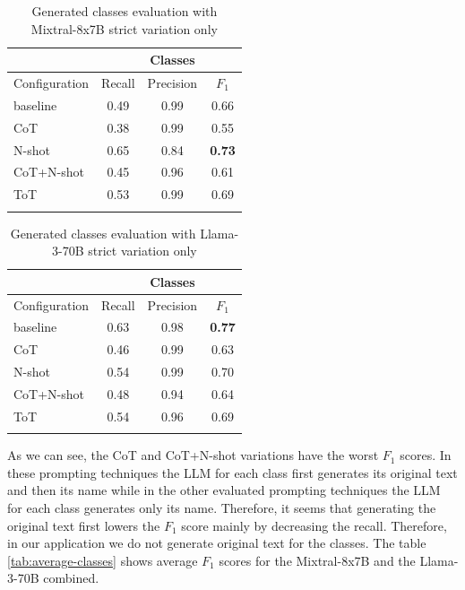 \begin{table}[!h]
    \scriptsize
    \centering
    \setlength{\tabcolsep}{0.5em}
    \begin{tabular}{lccc}
    \toprule
         & & Classes & \\
     \toprule
        Configuration & Recall & Precision & $F_1$ \\
    \toprule
    
    \addlinespace
         baseline    & 0.49 & 0.99 & 0.66 \\
    	 CoT         & 0.38 & 0.99 & 0.55 \\
         N-shot      & 0.65 & 0.84 & \textbf{0.73} \\
         CoT+N-shot  & 0.45 & 0.96 & 0.61 \\
         ToT         & 0.53 & 0.99 & 0.69 \\
    \addlinespace
    \bottomrule
    \addlinespace
    \end{tabular}
    \caption{Generated classes evaluation with Mixtral-8x7B strict variation only}
    \label{tab:mixtral-classes}
\end{table}


\begin{table}[!h]
    \scriptsize
    \centering
    \setlength{\tabcolsep}{0.5em}
    \begin{tabular}{lccc}
    \toprule
    & & Classes & \\
    \toprule
        Configuration & Recall & Precision & $F_1$ \\
    \toprule
    
    \addlinespace
         baseline    & 0.63 & 0.98 & \textbf{0.77} \\
    	 CoT         & 0.46 & 0.99 & 0.63 \\
         N-shot      & 0.54 & 0.99 & 0.70 \\
         CoT+N-shot  & 0.48 & 0.94 & 0.64 \\
         ToT         & 0.54 & 0.96 & 0.69 \\
    \addlinespace
    \bottomrule
    \addlinespace
    \end{tabular}
    \caption{Generated classes evaluation with Llama-3-70B strict variation only}
    \label{tab:llama-classes}
\end{table}




As we can see, the CoT and CoT+N-shot variations have the worst $F_1$ scores. In these prompting techniques the LLM for each class first generates its original text and then its name while in the other evaluated prompting techniques the LLM for each class generates only its name. Therefore, it seems that generating the original text first lowers the $F_1$ score mainly by decreasing the recall. Therefore, in our application we do not generate original text for the classes. The table \ref{tab:average-classes} shows average $F_1$ scores for the Mixtral-8x7B and the Llama-3-70B combined.


